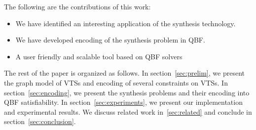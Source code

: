 The following are the contributions of this work:
\begin{itemize}
\item We have identified an interesting application of
  the synthesis technology.
\item We have developed encoding of the synthesis problem in QBF.
\item A user friendly and scalable tool based on QBF solvers
\end{itemize}

The rest of the paper is organized as follows.
%
In section~\ref{sec:prelim}, we present the graph model of VTSs and encoding of several
constraints on VTSs.
%
In section~\ref{sec:encoding}, we present the synthesis problems and their
encoding into QBF satisfiability.
%
In section~\ref{sec:experiments}, we present our implementation and experimental results.
%
We discuss related work in~\ref{sec:related} and conclude in section~\ref{sec:conclusion}.




